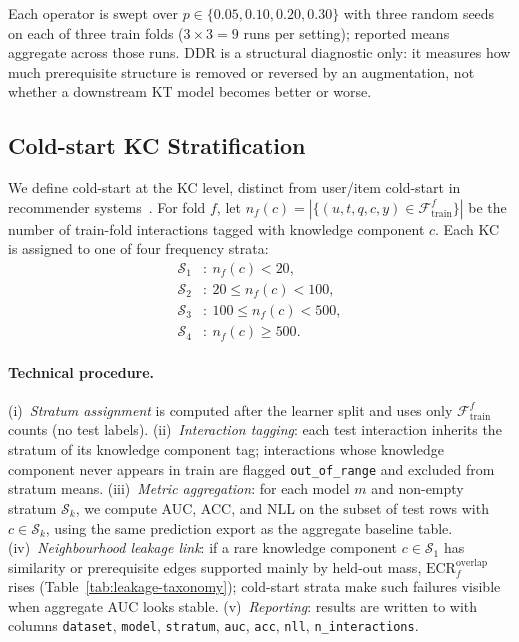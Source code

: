 \documentclass[runningheads]{llncs}
\newcommand{\KC}{knowledge component}
\newcommand{\DDR}{\textsc{DDR}}
\begin{document}
Each operator is swept over $p\in\{0.05,0.10,0.20,0.30\}$ with three
random seeds on each of three train folds ($3\times 3=9$ runs per
setting); reported means aggregate across those runs. \DDR{} is a structural diagnostic only: it measures how
much prerequisite structure is removed or reversed by an augmentation,
not whether a downstream KT model becomes better or worse.
\subsection{Cold-start KC Stratification}
\label{sec:cold-start}
We define cold-start at the KC level, distinct from user/item
cold-start in recommender systems~\cite{schein2002coldstart}. For fold
$f$, let $n_f(c)=|\{(u,t,q,c,y)\in\mathcal{F}_{\text{train}}^f\}|$ be
the number of train-fold interactions tagged with \KC{} $c$. Each KC
is assigned to one of four frequency strata:
\[
\begin{aligned}
\mathcal{S}_1&:\ n_f(c)<20,\\
\mathcal{S}_2&:\ 20\le n_f(c)<100,\\
\mathcal{S}_3&:\ 100\le n_f(c)<500,\\
\mathcal{S}_4&:\ n_f(c)\ge 500.
\end{aligned}
\]
\paragraph{Technical procedure.}
(i)~\emph{Stratum assignment} is computed after the learner split and
uses only $\mathcal{F}_{\text{train}}^f$ counts (no test labels).
(ii)~\emph{Interaction tagging}: each test interaction inherits the
stratum of its \KC{} tag; interactions whose \KC{} never appears in train
are flagged \texttt{out\_of\_range} and excluded from stratum means.
(iii)~\emph{Metric aggregation}: for each model $m$ and non-empty stratum
$\mathcal{S}_k$, we compute AUC, ACC, and NLL on the subset of test
rows with $c\in\mathcal{S}_k$, using the same prediction export as the
aggregate baseline table.
(iv)~\emph{Neighbourhood leakage link}: if a rare \KC{} $c\in\mathcal{S}_1$
has similarity or prerequisite edges supported mainly by held-out mass,
$\mathrm{ECR}^{\mathrm{overlap}}_f$ rises (Table~\ref{tab:leakage-taxonomy});
cold-start strata make such failures visible when aggregate AUC looks stable.
(v)~\emph{Reporting}: results are written to
 with columns
\texttt{dataset}, \texttt{model}, \texttt{stratum}, \texttt{auc},
\texttt{acc}, \texttt{nll}, \texttt{n\_interactions}.
\end{document}

